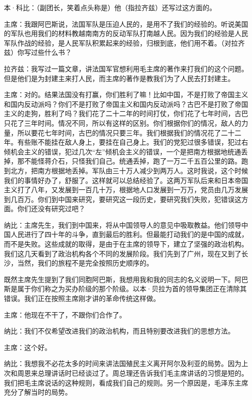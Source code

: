 本·科比：（副团长，笑着点头称是）他（指拉齐兹）还写过这方面的。

主席：我跟阿巴斯说，法国军队是压迫人民的，是用不了我们的经验的。听说美国的军队也用我们的材料教越南南方的反动军队打南越人民。因为我们的经验是人民军队作战的经验，是人民军队积累起来的经验，归根到底，他们用不着。（对拉齐兹）你写过些什么书？

拉齐兹：我写过一篇文章，讲法国军官想利用毛主席的著作来打我们的这个问题。但是他们是为封建主来打人民，而主席的著作是教我们为了人民去打封建主。

主席：对的。结果法国没有打赢，你们胜利了嘛！比如中国，不是打败了帝国主义和国内反动派吗？你们不是打败了帝国主义和国内反动派吗？古巴不是打败了帝国主义的走狗，胜利了吗？我们花了二十二年的时间打仗，你们花了七年时间，古巴只花了三年时间。情况不同，所以有这样的区别。你们根据你们的情况，敌人的力量，所以要花七年时间，古巴的情况只要三年。我们根据我们的情况花了二十二年。有些账不能挂在敌人身上，要挂在自己身上。我们的党犯过很多错误，犯过右倾机会主义的错误，犯过几次“左”倾机会主义的错误，一个是把南方根据地统通丢掉，那不能怪蒋介石，只怪我们自己。统通丢掉，跑了一万二千五百公里的路。跑到北方，把南方根据地丢掉。军队由三十万人减少到两万人。这时我说，这个时候我们的事情好办了，舒服了。这样就可以总结经验了。这两万军队后来和日本帝国主义打了八年，又发展到一百几十万，根据地人口发展到一万万，党员由几万发展到几百万。你们到中国来研究，要研究这一段历史，要研究我们失败，犯错误这方面。你们还没有研究过吧？

纳比：主席先生，我们到中国来，将从中国领导人的意见中吸取教益。他们领导中国人民进行了四十年的斗争，直到最后的胜利。但最能打动我们的是中国的成就，而不是失败。这些成就的取得，是由于在主席的领导下，建立了坚强的政治机构。我们这几天看到了政治机构各个不同的发展阶段。我们先到了广州，现在又到了长沙，当然，我们的旅程不是完全按照历史顺序的。

既然主席先生提到了我们同胞阿巴斯，我想用我和我的同志的名义说明一下。阿巴斯是属于你们称之为买办阶级的那个阶级。以本·贝拉为首的领导集团正在清除其错误。我们正在按照主席刚才讲的革命传统这样做。

主席：他现在不干了，不跟你们合作了。

纳比：我们不仅希望改进我们的政治机构，而且特别要改进我们的思想方法。

主席：这个好。

纳比：我想我不必花太多的时间来讲法国殖民主义离开阿尔及利亚的局势。因为上次和周恩来总理讲话时已经谈过了。周总理还告诉我们毛主席讲话的习惯是短的。我们把毛主席说话的这种规则，看成我们自己的规则。另一个原因是，毛泽东主席充分了解当时的局势。

